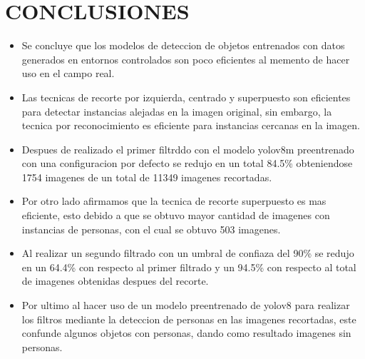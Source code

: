 \chapter*{CONCLUSIONES}

\begin{itemize}
  \item Se concluye que los modelos de deteccion de objetos entrenados con datos generados en entornos controlados son poco eficientes al memento de hacer uso en el campo real.
  \item Las tecnicas de recorte por izquierda, centrado y superpuesto son eficientes para detectar instancias alejadas en la imagen original, sin embargo, la tecnica por reconocimiento es eficiente para instancias cercanas en la imagen.
  \item Despues de realizado el primer filtrddo con el modelo yolov8m preentrenado con una configuracion por defecto se redujo en un total 84.5\% obteniendose 1754 imagenes de un total de 11349 imagenes recortadas.
  \item Por otro lado afirmamos que la tecnica de recorte superpuesto es mas eficiente, esto debido a que se obtuvo mayor cantidad de imagenes con instancias de personas, con el cual se obtuvo 503 imagenes.
  \item Al realizar un segundo filtrado con un umbral de confiaza del 90\% se redujo en un 64.4\% con respecto al primer filtrado y un 94.5\% con respecto al total de imagenes obtenidas despues del recorte.
  \item Por ultimo al hacer uso de un modelo preentrenado de yolov8 para realizar los filtros mediante la deteccion de personas en las imagenes recortadas, este confunde algunos objetos con personas, dando como resultado imagenes sin personas.
\end{itemize}
